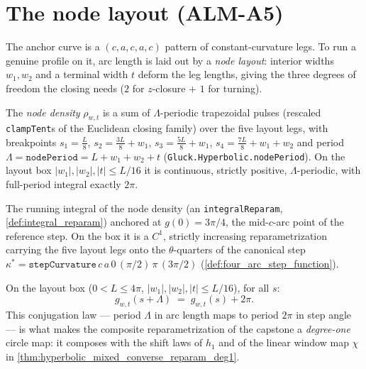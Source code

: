 \section{The node layout (ALM-A5)}

The anchor curve is a $(c,a,c,a,c)$ pattern of constant-curvature legs.  To
run a genuine profile on it, arc length is laid out by a \emph{node layout}:
interior widths $w_1,w_2$ and a terminal width $t$ deform the leg lengths,
giving the three degrees of freedom the closing needs ($2$ for $z$-closure
$+$ $1$ for turning).

\begin{definition}
  \label{def:node_density}
  The \emph{node density} $\rho_{w,t}$ is a sum of $\Lambda$-periodic
  trapezoidal pulses (rescaled \texttt{clampTent}s of the Euclidean closing
  family) over the five layout legs, with breakpoints $s_1=\tfrac L8$,
  $s_2=\tfrac{3L}8+w_1$, $s_3=\tfrac{5L}8+w_1$, $s_4=\tfrac{7L}8+w_1+w_2$ and
  period $\Lambda=\texttt{nodePeriod}=L+w_1+w_2+t$
  (\texttt{Gluck.Hyperbolic.nodePeriod}).  On the layout box
  $|w_1|,|w_2|,|t|\le L/16$ it is continuous, strictly positive,
  $\Lambda$-periodic, with full-period integral exactly $2\pi$.
\end{definition}

\begin{definition}
  \label{def:node_map}
  The running integral of the node density (an \texttt{integralReparam},
  \cref{def:integral_reparam}) anchored at $g(0)=3\pi/4$, the mid-$c$-arc
  point of the reference step.  On the box it is a $C^1$, strictly increasing
  reparametrization carrying the five layout legs onto the $\theta$-quarters
  of the canonical step
  $\kappa^*=\texttt{stepCurvature}\,c\,a\,0\,(\pi/2)\,\pi\,(3\pi/2)$
  (\cref{def:four_arc_step_function}).
\end{definition}

\begin{lemma}
  \label{lem:node_map_add_period}
  On the layout box ($0<L\le4\pi$, $|w_1|,|w_2|,|t|\le L/16$), for all $s$:
  \[
    g_{w,t}(s+\Lambda)\;=\;g_{w,t}(s)+2\pi .
  \]
  This conjugation law — period $\Lambda$ in arc length maps to period $2\pi$
  in step angle — is what makes the composite reparametrization of the
  capstone a \emph{degree-one} circle map: it composes with the shift laws of
  $h_1$ and of the linear window map $\chi$ in
  \cref{thm:hyperbolic_mixed_converse_reparam_deg1}.
\end{lemma}

